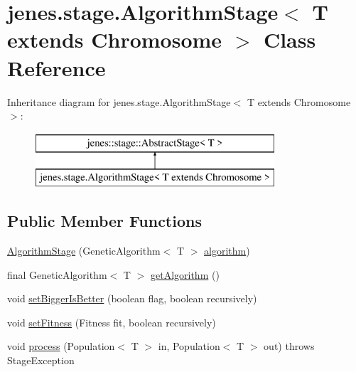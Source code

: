\hypertarget{classjenes_1_1stage_1_1_algorithm_stage_3_01_t_01extends_01_chromosome_01_4}{\section{jenes.\-stage.\-Algorithm\-Stage$<$ T extends Chromosome $>$ Class Reference}
\label{classjenes_1_1stage_1_1_algorithm_stage_3_01_t_01extends_01_chromosome_01_4}
}
Inheritance diagram for jenes.\-stage.\-Algorithm\-Stage$<$ T extends Chromosome $>$\-:\begin{figure}[H]
\begin{center}
\leavevmode
\includegraphics[height=2.000000cm]{classjenes_1_1stage_1_1_algorithm_stage_3_01_t_01extends_01_chromosome_01_4}
\end{center}
\end{figure}
\subsection*{Public Member Functions}
\begin{DoxyCompactItemize}
\item 
\hyperlink{classjenes_1_1stage_1_1_algorithm_stage_3_01_t_01extends_01_chromosome_01_4_a802871d36189757fc869c5a542dc1b9c}{Algorithm\-Stage} (Genetic\-Algorithm$<$ T $>$ \hyperlink{classjenes_1_1stage_1_1_algorithm_stage_3_01_t_01extends_01_chromosome_01_4_a574e24c0df0afa4d327ff076e5e814f8}{algorithm})
\item 
final Genetic\-Algorithm$<$ T $>$ \hyperlink{classjenes_1_1stage_1_1_algorithm_stage_3_01_t_01extends_01_chromosome_01_4_a7c1be30eb9852c0f16031f3802d770aa}{get\-Algorithm} ()
\item 
void \hyperlink{classjenes_1_1stage_1_1_algorithm_stage_3_01_t_01extends_01_chromosome_01_4_a5d27c95b7872fc28cc7b78be601dd9d0}{set\-Bigger\-Is\-Better} (boolean flag, boolean recursively)
\item 
void \hyperlink{classjenes_1_1stage_1_1_algorithm_stage_3_01_t_01extends_01_chromosome_01_4_a43c9964c60c539aaea0193c9552b262b}{set\-Fitness} (Fitness fit, boolean recursively)
\item 
void \hyperlink{classjenes_1_1stage_1_1_algorithm_stage_3_01_t_01extends_01_chromosome_01_4_a43a7b7271f320f04c8be69bfdafb078e}{process} (Population$<$ T $>$ in, Population$<$ T $>$ out)  throws Stage\-Exception 
\end{DoxyCompactItemize}

